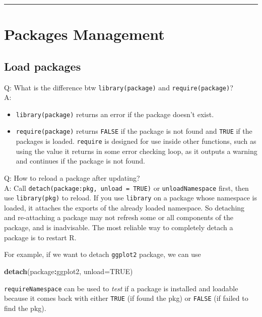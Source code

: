 \documentclass[
  a4paper,
  twoside,
  openright]{book}
\newenvironment{Shaded}{\begin{snugshade}}{\end{snugshade}}
\newcommand{\AttributeTok}[1]{\textcolor[rgb]{0.13,0.29,0.53}{#1}}
\newcommand{\ConstantTok}[1]{\textcolor[rgb]{0.56,0.35,0.01}{#1}}
\newcommand{\FunctionTok}[1]{\textcolor[rgb]{0.13,0.29,0.53}{\textbf{#1}}}
\newcommand{\NormalTok}[1]{#1}
\newcommand{\SpecialCharTok}[1]{\textcolor[rgb]{0.81,0.36,0.00}{\textbf{#1}}}
\theoremstyle{definition}
\theoremstyle{definition}
\theoremstyle{definition}
\theoremstyle{definition}
\theoremstyle{remark}
\begin{document}
\begin{center}\rule{0.5\linewidth}{0.5pt}\end{center}

\section{Packages Management}\label{packages-management}

\subsection{Load packages}\label{load-packages}

Q: What is the difference btw \texttt{library(package)} and \texttt{require(package)}?\\
A:

\begin{itemize}
\item
  \texttt{library(package)} returns an error if the package doesn't exist.
\item
  \texttt{require(package)} returns \texttt{FALSE} if the package is not found and \texttt{TRUE} if the packages is loaded. \texttt{require} is designed for use inside other functions, such as using the value it returns in some error checking loop, as it outputs a warning and continues if the package is not found.
\end{itemize}

Q: How to reload a package after updating?\\
A: Call \texttt{detach(package:pkg,\ unload\ =\ TRUE)} or \texttt{unloadNamespace} first, then use \texttt{library(pkg)} to reload. If you use \texttt{library} on a package whose namespace is loaded, it attaches the exports of the already loaded namespace. So detaching and re-attaching a package may not refresh some or all components of the package, and is inadvisable. The most reliable way to completely detach a package is to {restart R}.

For example, if we want to detach \texttt{ggplot2} package, we can use

\begin{Shaded}
\begin{Highlighting}[]
\FunctionTok{detach}\NormalTok{(package}\SpecialCharTok{:}\NormalTok{ggplot2, }\AttributeTok{unload=}\ConstantTok{TRUE}\NormalTok{)}
\end{Highlighting}
\end{Shaded}

\texttt{requireNamespace} can be used to \emph{test} if a package is installed and loadable because it comes back with either \texttt{TRUE} (if found the pkg) or \texttt{FALSE} (if failed to find the pkg).
\end{document}
